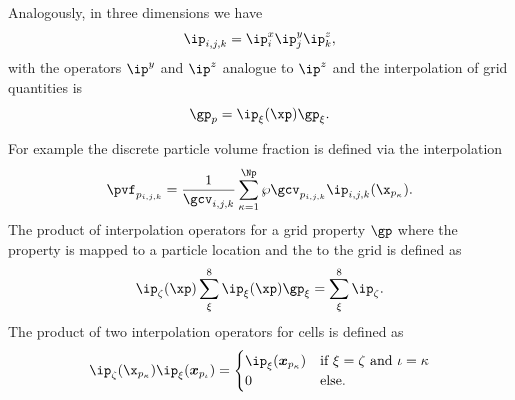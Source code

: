 Analogously, in three dimensions we have
\begin{equation*}
    \ip_{i,j,k} = \ip^x_i \ip^y_j \ip^z_k,
\end{equation*}
with the operators $\ip^y$ and $\ip^z$ analogue to $\ip^z$ and the interpolation of grid quantities is
\begin{equation*}
    \gp_p = \ip_\xi ( \xp) \gp_\xi.
\end{equation*}

For example the discrete particle volume fraction is defined via the interpolation
\begin{equation*}
    \pvf_{p_{i,j,k}} = \dfrac{1}{\gcv_{i,j,k}} \sum_{\kappa = 1}^{\Np} \wp \gcv_{p_{i,j,k}} \ip_{i,j,k} (\x_{p_\kappa}).
\end{equation*}
The product of interpolation operators for a grid property $\gp$ where the property is mapped to a particle location and the to the grid is defined as
\begin{equation*}
    \ip_\zeta (\xp) \sum_{\xi}^8 \ip_\xi (\xp) \gp_\xi = \sum_{\xi}^{8} \ip_\zeta.
\end{equation*}
The product of two interpolation operators for cells is defined as
\begin{equation}
\label{eq:ipOrtho}
    \ip_\zeta(\boldsymbol{\x}_{p_{\kappa}})\ip_{\xi} (\boldsymbol{x}_{p_\iota}) = \begin{cases}
        \ip_{\xi}(\boldsymbol{x}_{p_\kappa}) & \text{if } \xi = \zeta \text{ and } \iota = \kappa \\
        0 & \text{else}.
    \end{cases}
\end{equation} 

